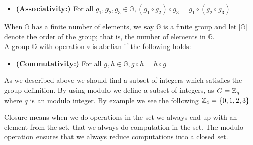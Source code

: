 \begin{defi}
\begin{itemize}
\item \textnormal{\textbf{(Associativity:)}} For all \begin{math}g_1, g_2, g_3 \in \mathbb{G}, (g_1 \circ g_2) \circ g_3 = g_1 \circ( g_2 \circ g_3) \end{math}
\end{itemize}
When \begin{math}\mathbb{G}\end{math} has a finite number of elements, we say \begin{math}\mathbb{G}\end{math} is a finite group and let
\begin{math}| \mathbb{G}|\end{math} denote the order of the group; that is, the number of elements in \begin{math}\mathbb{G}\end{math}. \\
A group \begin{math}\mathbb{G}\end{math} with operation \begin{math}\circ\end{math} is abelian if the following holds:
\begin{itemize}
\item \textnormal{\textbf{(Commutativity:)}} For all \begin{math}g, h \in \mathbb{G}, g \circ h = h \circ g \end{math}
\end{itemize}
\end{defi}

\noindent
As we described above we should find a subset of integers which satisfies the group definition. By using modulo we define a subset of integers, as $G= \mathbb{Z}_q $ where $q$ is an modulo integer. By example we see the following \begin{math} \mathbb{Z}_4 = \{0,1,2,3\}\end{math}   


 Closure means when we do operations in the set we always end up with an element from the set. that we always do computation in the set. The modulo operation ensures that we always reduce computations into a closed set.


